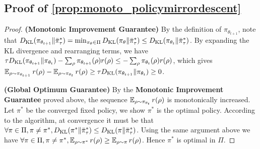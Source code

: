 \subsection{Proof of \cref{prop:monoto_policymirrordescent}}
\label{appsec:monoto_policymirrordescent}
\begin{proof}
	{\bf (Monotonic Improvement Guarantee)} By the definition of $\pi_{\theta_{t+1}}$, note that $D_{\mathrm{KL}}(\pi_{\theta_{t+1}} \| \bar{\pi}_\tau^*)  = \min_{\pi_\theta \in \Pi}{ D_{\mathrm{KL}}(\pi_\theta \| \bar{\pi}_\tau^*)} \leq D_{\mathrm{KL}}(\pi_{\theta_{t}} \| \bar{\pi}_\tau^*)$. By expanding the KL divergence and rearranging terms, we have $ \tau D_{\mathrm{KL}}(\pi_{\theta_{t+1}} \| \pi_{\theta_{t}}) - \sum_{\rho}{ \pi_{\theta_{t+1}}(\rho) r(\rho) } \leq - \sum_{\rho}{ \pi_{\theta_{t}}(\rho) r(\rho) }$, which gives $\operatorname*{\mathbb{E}}_{\rho \sim \pi_{\theta_{t+1}}}{  r(\rho)} - \operatorname*{\mathbb{E}}_{\rho \sim \pi_{\theta_{t}}}{  r(\rho)} \geq \tau D_{\mathrm{KL}}(\pi_{\theta_{t+1}} \| \pi_{\theta_{t}}) \geq 0$.
	
	{\bf (Global Optimum Guarantee)} By the {\bf Monotonic Improvement Guarantee} proved above, the sequence $\operatorname{\mathbb{E}}_{\rho \sim \pi_{\theta_t}}{ r(\rho)}$ is monotonically increased. Let $\pi^*$ be the converged fixed policy, we show $\pi^*$ is the optimal policy. According to the algorithm, at convergence it must be that $\forall \pi\in \Pi, \pi\neq \pi^*, D_{\mathrm{KL}}(\pi^* \| \bar{\pi}_\tau^*) \leq D_{\mathrm{KL}}(\pi \| \bar{\pi}_\tau^*)$. Using the same argument above we have $\forall \pi\in \Pi, \pi\neq \pi^*, \operatorname{\mathbb{E}}_{\rho \sim \pi^*}{ r(\rho)} \geq \operatorname{\mathbb{E}}_{\rho \sim \pi}{ r(\rho)}$. Hence $\pi^*$ is optimal in $\Pi$. 
	

\end{proof}
